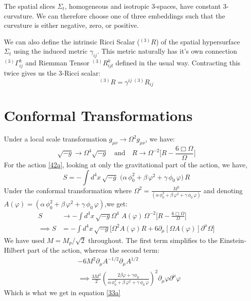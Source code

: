 \documentclass[aps,prd,reprint,preprintnumbers,showpacs,floatfix,nofootinbib,superscript address]{revtex4-2}
\begin{document}

The spatial slices $\Sigma_t$, homogeneous and isotropic 3-spaces, have constant 3-curvature. We can therefore choose one of three embeddings such that the curvature is either negative, zero, or positive. 

We can also define the intrinsic Ricci Scalar (${}^{(3)}R$) of the spatial hypersurface $\Sigma_t$ using the induced metric $\gamma_{ij}$. This metric naturally has it's own connection ${}^{(3)}\Gamma_{ij}^k$ and Riemman Tensor ${}^{(3)}R_{ijl}^k$ defined in the usual way. Contracting this twice gives us the 3-Ricci scalar:
\begin{equation}
    {}^{(3)}R = \gamma^{ij} \,{}^{(3)}R_{ij}
\end{equation}


\section{Conformal Transformations} \label{Conformal Transformations}

Under a local scale transformation $g_{\mu\nu} \rightarrow \Omega^2 g_{\mu\nu} $, we have:
\[
 \sqrt{-g} \rightarrow \Omega^{4} \sqrt{-g} \quad\text{and}\quad R\rightarrow\Omega^{-2}\Big[R-\frac{6\Box\Omega}{\Omega} \Big]
\]
For the action \cref{42a}, looking at only the gravitational part of the action, we have,
\begin{equation}
    S = -\int d^4x\,\sqrt{-g}\, 
  \,\bigl(\alpha\,\phi_0^2 + \beta\,\varphi^2 + \gamma\,\phi_0\,\varphi\bigr)\,R
\end{equation}
Under the conformal transformation where $ \Omega^2 = \frac{M^2}{(\alpha\,\phi_0^2+\beta\,\varphi^2+\gamma\,\phi_0\,\varphi)}$ and denoting $A(\varphi) = (\alpha\,\phi_0^2+\beta\,\varphi^2+\gamma\,\phi_0\,\varphi)$,we get:
\begin{align}
    S &\rightarrow -\int d^4x\,\sqrt{-g} \Omega^{4}\, 
  \,A(\varphi)\, \Omega^{-2}\Big[R-\frac{6\Box\Omega}{\Omega} \Big] \nonumber \\
  \implies S &= - \int d^4x\,\sqrt{-g} \Big[ \Omega^2 A(\varphi) R + 6 \partial_\mu[\Omega A(\varphi)] \partial^\mu\Omega \Big]
\end{align}
We have used $M = M_p/\sqrt{2}$ throughout. The first term simplifies to the Einstein-Hilbert part of the action, whereas the second term:
\begin{align}
    &-6M^2 \partial_\mu A^{-1/2} \partial_\mu A^{1/2} \nonumber \\
    &\implies \frac{3M^2}{2} \left( \frac{2\beta \varphi + \gamma\phi_0}{\alpha\,\phi_0^2+\beta\,\varphi^2+\gamma\,\phi_0\,\varphi} \right)^2 \partial_\mu \varphi \partial^\mu \varphi
\end{align}
Which is what we get in equation \cref{33a}
\end{document}
